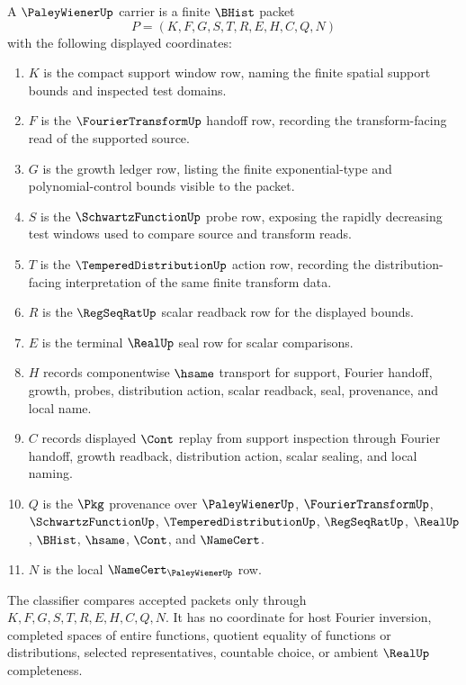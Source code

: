 \begin{definition}
\label{def:paley-wiener-carrier}
A $\PaleyWienerUp$ carrier is a finite $\BHist$ packet
$$
P=(K,F,G,S,T,R,E,H,C,Q,N)
$$
with the following displayed coordinates:
\begin{enumerate}
\item $K$ is the compact support window row, naming the finite spatial support bounds and inspected test domains.
\item $F$ is the $\FourierTransformUp$ handoff row, recording the transform-facing read of the supported source.
\item $G$ is the growth ledger row, listing the finite exponential-type and polynomial-control bounds visible to the packet.
\item $S$ is the $\SchwartzFunctionUp$ probe row, exposing the rapidly decreasing test windows used to compare source and transform reads.
\item $T$ is the $\TemperedDistributionUp$ action row, recording the distribution-facing interpretation of the same finite transform data.
\item $R$ is the $\RegSeqRatUp$ scalar readback row for the displayed bounds.
\item $E$ is the terminal $\RealUp$ seal row for scalar comparisons.
\item $H$ records componentwise $\hsame$ transport for support, Fourier handoff, growth, probes, distribution action, scalar readback, seal, provenance, and local name.
\item $C$ records displayed $\Cont$ replay from support inspection through Fourier handoff, growth readback, distribution action, scalar sealing, and local naming.
\item $Q$ is the $\Pkg$ provenance over $\PaleyWienerUp$, $\FourierTransformUp$, $\SchwartzFunctionUp$, $\TemperedDistributionUp$, $\RegSeqRatUp$, $\RealUp$, $\BHist$, $\hsame$, $\Cont$, and $\NameCert$.
\item $N$ is the local $\NameCert_{\PaleyWienerUp}$ row.
\end{enumerate}
The classifier compares accepted packets only through $K,F,G,S,T,R,E,H,C,Q,N$. It has no coordinate for host Fourier inversion, completed spaces of entire functions, quotient equality of functions or distributions, selected representatives, countable choice, or ambient $\RealUp$ completeness.
\end{definition}

